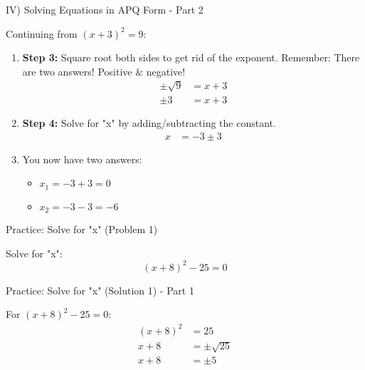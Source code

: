 \documentclass[aspectratio=169]{beamer}
\begin{document}
\begin{frame}{IV) Solving Equations in APQ Form - Part 2}
    \begin{tcolorbox}[colback=lightgray,colframe=primary,title=Key Steps - Part 2 (Cont.)]
        \footnotesize
        Continuing from $(x+3)^2 = 9$:
        \begin{enumerate}
            \item \textbf{Step 3:} Square root both sides to get rid of the exponent. Remember: There are two answers! Positive \& negative!
                \begin{align*}
                    \pm\sqrt{9} &= x+3 \\
                    \pm 3 &= x+3
                \end{align*}
            \item \textbf{Step 4:} Solve for "x" by adding/subtracting the constant.
                \begin{align*}
                    x &= -3 \pm 3
                \end{align*}
            \item You now have two answers:
                \begin{itemize}
                    \item \(x_1 = -3 + 3 = 0\)
                    \item \(x_2 = -3 - 3 = -6\)
                \end{itemize}
        \end{enumerate}
    \end{tcolorbox}
\end{frame}

\begin{frame}{Practice: Solve for "x" (Problem 1)}
    \begin{tcolorbox}[colback=lightgray,colframe=primary,title=Problem 1]
        \footnotesize
        Solve for "x":
        \[ (x+8)^2 - 25 = 0 \]
    \end{tcolorbox}
\end{frame}

\begin{frame}{Practice: Solve for "x" (Solution 1) - Part 1}
    \begin{tcolorbox}[colback=lightgray,colframe=accent,title=Solution 1 - Part 1]
        \footnotesize
        For $(x+8)^2 - 25 = 0$:
        \begin{align*}
            (x+8)^2 &= 25 \\
            x+8 &= \pm\sqrt{25} \\
            x+8 &= \pm 5
        \end{align*}
    \end{tcolorbox}
\end{frame}
\end{document}
